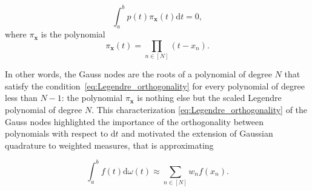 \documentclass[twoside,11pt]{book}
\numberwithin{theorem}{chapter}
\numberwithin{definition}{chapter}
\numberwithin{proposition}{chapter}
\numberwithin{corollary}{chapter}
\numberwithin{example}{chapter}
\numberwithin{lemma}{chapter}
\numberwithin{assumption}{chapter}
\begin{document}
\begin{equation}\label{eq:Legendre_orthogonality}
\int_{a}^{b} p(t) \pi_{\bm{x}}(t) \mathrm{d}t = 0,
\end{equation}
where $\pi_{\bm{x}}$ is the polynomial
\begin{equation}
\pi_{\bm{x}}(t) = \prod\limits_{n \in [N]}(t-x_{n}).
\end{equation}



 In other words, the Gauss nodes are the roots of a polynomial of degree $N$ that satisfy the condition~\eqref{eq:Legendre_orthogonality} for every polynomial of degree less than $N-1$: the polynomial $\pi_{\bm{x}}$ is nothing else but the scaled Legendre polynomial of degree $N$.
 This characterization \eqref{eq:Legendre_orthogonality} of the Gauss nodes highlighted the importance of the orthogonality between polynomials with respect to $\mathrm{d}t$ and motivated the extension of Gaussian quadrature to weighted measures, that is approximating

\begin{equation}
\int_{a}^{b}f(t)\mathrm{d}\omega(t) \approx \sum\limits_{n \in [N]} w_{n}f(x_{n}).
\end{equation}

\end{document}
